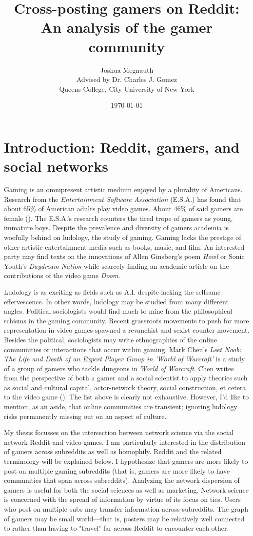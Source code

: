 \documentclass[12pt, a4paper]{article}
\title{Cross-posting gamers on Reddit: An analysis of the gamer community}
\author{Joshua Megnauth\\[1cm]{\small Advised by Dr. Charles J. Gomez}\\[1cm]{\small Queens College, City University of New York}}
\date{\today}
\begin{document}
\maketitle

\section{Introduction: Reddit, gamers, and social networks}
Gaming is an omnipresent artistic medium enjoyed by a plurality of Americans. Research from the \textit{Entertainment Software Association} (E.S.A.) has found that about 65\% of American adults play video games. About 46\% of said gamers are female (\cite{esagamers}). The E.S.A.'s research counters the tired trope of gamers as young, immature boys. Despite the prevalence and diversity of gamers academia is woefully behind on ludology, the study of gaming. Gaming lacks the prestige of other artistic entertainment media such as books, music, and film. An interested party may find texts on the innovations of Allen Ginsberg's poem \textit{Howl} or Sonic Youth's \textit{Daydream Nation} while scarcely finding an academic article on the contributions of the video game \textit{Doom}.

Ludology is as exciting as fields such as A.I. despite lacking the selfsame effervescence. In other words, ludology may be studied from many different angles. Political sociologists would find much to mine from the philosophical schisms in the gaming community. Recent grassroots movements to push for more representation in video games spawned a revanchist and sexist counter movement. Besides the political, sociologists may write ethnographies of the online communities or interactions that occur within gaming. Mark Chen's \textit{Leet Noob: The Life and Death of an Expert Player Group in 'World of Warcraft'} is a study of a group of gamers who tackle dungeons in \textit{World of Warcraft}. Chen writes from the perspective of both a gamer and a social scientist to apply theories such as social and cultural capital, actor-network theory, social construction, et cetera to the video game (\cite{chenwow}). The list above is clearly not exhaustive. However, I'd like to mention, as an aside, that online communities are transient; ignoring ludology risks permanently missing out on an aspect of culture.

My thesis focusses on the intersection between network science via the social network Reddit and video games. I am particularly interested in the distribution of gamers across subreddits as well as homophily. Reddit and the related terminology will be explained below. I hypothesize that gamers are more likely to post on multiple gaming subreddits (that is, gamers are more likely to have communities that span across subreddits). Analyzing the network dispersion of gamers is useful for both the social sciences as well as marketing. Network science is concerned with the spread of information by virtue of its focus on ties. Users who post on multiple subs may transfer information across subreddits. The graph of gamers may be small world---that is, posters may be relatively well connected to rather than having to "travel" far across Reddit to encounter each other.
\end{document}
